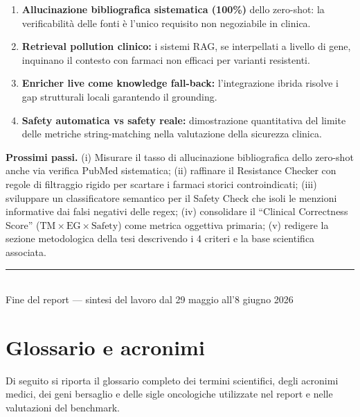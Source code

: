 \documentclass[11pt,a4paper]{article}
\begin{document}
\begin{defbox}
\begin{enumerate}[leftmargin=1.4em]
\item \textbf{Allucinazione bibliografica sistematica (100\%)} dello zero-shot: la verificabilit\`a delle fonti \`e l'unico requisito non negoziabile in clinica.
\item \textbf{Retrieval pollution clinico:} i sistemi RAG, se interpellati a livello di gene, inquinano il contesto con farmaci non efficaci per varianti resistenti.
\item \textbf{Enricher live come knowledge fall-back:} l'integrazione ibrida risolve i gap strutturali locali garantendo il grounding.
\item \textbf{Safety automatica vs safety reale:} dimostrazione quantitativa del limite delle metriche string-matching nella valutazione della sicurezza clinica.
\end{enumerate}
\end{defbox}

\noindent \textbf{Prossimi passi.} (i) Misurare il tasso di allucinazione bibliografica dello zero-shot anche via verifica PubMed sistematica; (ii) raffinare il Resistance Checker con regole di filtraggio rigido per scartare i farmaci storici controindicati; (iii) sviluppare un classificatore semantico per il Safety Check che isoli le menzioni informative dai falsi negativi delle regex; (iv) consolidare il ``Clinical Correctness Score'' ($\mathrm{TM}\times\mathrm{EG}\times\mathrm{Safety}$) come metrica oggettiva primaria; (v) redigere la sezione metodologica della tesi descrivendo i 4 criteri e la base scientifica associata.

\vspace{8pt}
\begin{center}
{\color{rulec}\rule{0.5\textwidth}{0.6pt}}\\[4pt]
{\sffamily\footnotesize\color{inkgray} Fine del report --- sintesi del lavoro dal 29 maggio all'8 giugno 2026}
\end{center}

\section{Glossario e acronimi}
Di seguito si riporta il glossario completo dei termini scientifici, degli acronimi medici, dei geni bersaglio e delle sigle oncologiche utilizzate nel report e nelle valutazioni del benchmark.
\end{document}
